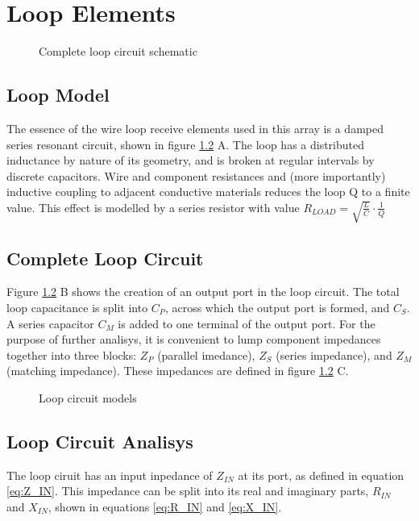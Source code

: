 \chapter{Loop Elements}

\clearpage\newpage
\begin{figure}
    \vspace{2.5in}
    \centering
    
    \caption{Complete loop circuit schematic}
    \label{fig:loop_schematic}
    \vspace{2.5in}
\end{figure}


\section{Loop Model}
The essence of the wire loop receive elements used in this array is a damped series resonant circuit, shown in figure
\ref{fig:loop_model} A. The loop has a distributed inductance by nature of its geometry, and is broken at regular
intervals by discrete capacitors.  Wire and component resistances and (more importantly) inductive coupling to adjacent
conductive materials reduces the loop Q to a finite value. This effect is modelled by a series resistor with value
$R_{LOAD}=\sqrt{\frac{L}{C}}\cdot\frac{1}{Q}$

\section{Complete Loop Circuit}
Figure \ref{fig:loop_model} B shows the creation of an output port in the loop circuit. The total loop capacitance is split into $C_P$, 
across which the output port is formed, and $C_S$. A series capacitor $C_M$ is added to one terminal of the output port.
For the purpose of further analisys, it is convenient to lump component impedances together into three blocks: $Z_P$ (parallel
imedance), $Z_S$ (series impedance), and $Z_M$ (matching impedance). These impedances are defined in figure \ref{fig:loop_model} C.

\begin{figure}

\caption{Loop circuit models}
\label{fig:loop_model}
\end{figure}

\section{Loop Circuit Analisys}
The loop ciruit has an input inpedance of $Z_{IN}$ at its port, as defined in equation \ref{eq:Z_IN}. This impedance can
be split into its real and imaginary parts, $R_{IN}$ and $X_{IN}$, shown in equations \ref{eq:R_IN} and \ref{eq:X_IN}.


